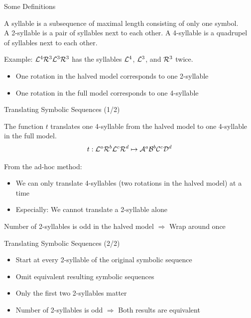 \begin{frame}{Some Definitions}
	\vspace{-1em}
	\begin{definition}[Syllables]
		A syllable is a subsequence of maximal length consisting of only one symbol. \\[1em]
		A 2-syllable is a pair of syllables next to each other.
		A 4-syllable is a quadrupel of syllables next to each other.
	\end{definition}
	\pause
	Example: $\mathcal{L}^4\mathcal{R}^3\mathcal{L}^3\mathcal{R}^3$ has the syllables $\mathcal{L}^4$, $\mathcal{L}^3$, and $\mathcal{R}^3$ twice.
	\vspace{1em}
	\begin{itemize}
		\pause
		\item One rotation in the halved model corresponds to one 2-syllable
		\item One rotation in the full model corresponds to one 4-syllable
	\end{itemize}
\end{frame}

\begin{frame}{Translating Symbolic Sequences (1/2)}
	\vspace{-1em}
	\begin{definition}
		The function $t$ translates one 4-syllable from the halved model to one 4-syllable in the full model.
		\begin{align*}
			t: \mathcal{L}^a\mathcal{R}^b\mathcal{L}^c\mathcal{R}^d \mapsto \mathcal{A}^a\mathcal{B}^b\mathcal{C}^c\mathcal{D}^d
		\end{align*}
	\end{definition}

	\pause
	From the ad-hoc method:
	\pause
	\begin{itemize}
		\item We can only translate 4-syllables (two rotations in the halved model) at a time
		\item Especially: We cannot translate a 2-syllable alone
	\end{itemize}
	\pause
	\vspace{1em}
	Number of 2-syllables is odd in the halved model $\Rightarrow$ Wrap around once
\end{frame}

\begin{frame}{Translating Symbolic Sequences (2/2)}
	\begin{itemize}
		\item Start at every 2-syllable of the original symbolic sequence
		\item Omit equivalent resulting symbolic sequences
		      \pause \vspace{2em}
		\item Only the first two 2-syllables matter
		\item Number of 2-syllables is odd $\Rightarrow$ Both results are equivalent
	\end{itemize}
\end{frame}


